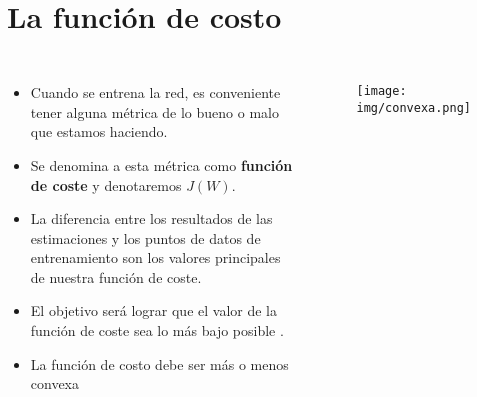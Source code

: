 \section{La función de costo}
\begin{frame}{\titulo}{\subtitulo}
    \begin{columns}
        \begin{itemize}
            \small
            \item Cuando se entrena la red, es conveniente tener alguna métrica de lo bueno o malo que estamos haciendo.

            \item Se denomina a esta métrica como {\bf función de coste} y denotaremos $J(W)$.\bigskip

            \item La diferencia entre los resultados de las estimaciones y los puntos de datos de entrenamiento son los valores principales de nuestra función de coste.\bigskip

            \item El objetivo será lograr que el valor de la función de coste sea lo más bajo posible .\bigskip

            \item La función de costo debe ser más o menos convexa
        \end{itemize}

        \begin{figure}[H]
            \texttt{[image: img/convexa.png]}
        \end{figure}
    \end{columns}
\end{frame}




